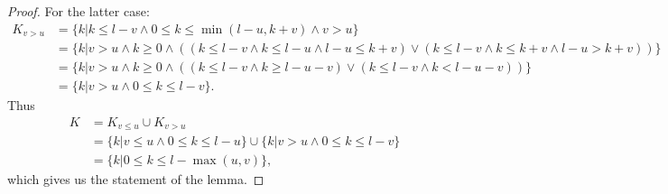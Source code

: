\begin{proof}
For the latter case:
\begin{equation*}
\begin{split}
	K_{v > u}
	& = \{k |
		k \le l - v
		\wedge 0 \le k \le \min(l - u, k + v)
		\wedge v > u
	\} \\
	& = \{k |
		v > u \wedge k \ge 0
		\wedge
		(
			(k \le l - v \wedge k \le l - u \wedge l - u \le k + v)
			\vee
			(k \le l - v \wedge k \le k + v \wedge l - u > k + v)
		)
	\} \\
	& = \{k |
		v > u \wedge k \ge 0
		\wedge
		(
			(k \le l - v \wedge k \ge l - u - v)
			\vee
			(k \le l - v \wedge k < l - u - v)
		)
	\} \\
	& = \{k | v > u \wedge 0 \le k \le l - v \}.
\end{split}
\end{equation*}
Thus
\begin{equation*}
\begin{split}
	K
	& = K_{v \le u} \cup K_{v > u} \\
	& = \{k | v \le u \wedge 0 \le k \le l - u \} \cup \{k | v > u \wedge 0 \le k \le l - v \} \\
	& = \{k | 0 \le k \le l - \max(u, v) \},
\end{split}
\end{equation*}
which gives us the statement of the lemma.
\end{proof}

